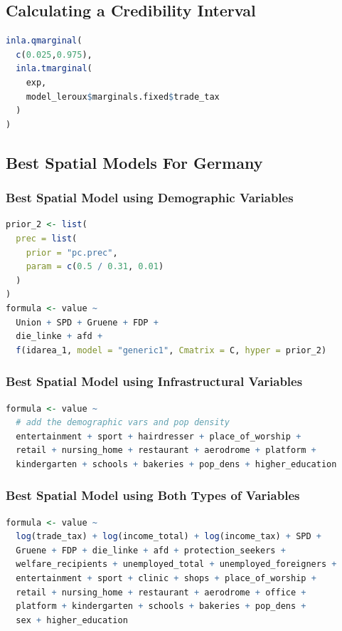 \subsection{Calculating a Credibility Interval}
\begin{lstlisting}[caption={Extracting the credibility interval for a coefficient}, label={codeCredibility}, language=R]
inla.qmarginal(
  c(0.025,0.975),
  inla.tmarginal(
    exp,
    model_leroux$marginals.fixed$trade_tax
  )
)
\end{lstlisting}
\subsection{Best Spatial Models For Germany}
\subsubsection{Best Spatial Model using Demographic Variables}
\begin{lstlisting}[caption={The code for the demographic model.}, label={codeDemoGermany}, language=R]
prior_2 <- list(
  prec = list(
    prior = "pc.prec",
    param = c(0.5 / 0.31, 0.01)
  )
)
formula <- value ~
  Union + SPD + Gruene + FDP +
  die_linke + afd + 
  f(idarea_1, model = "generic1", Cmatrix = C, hyper = prior_2)
\end{lstlisting}
\subsubsection{Best Spatial Model using Infrastructural Variables}
\begin{lstlisting}[caption={The code for the infrastructure model.}, label={codeInfraGermany}, language=R]
formula <- value ~
  # add the demographic vars and pop density
  entertainment + sport + hairdresser + place_of_worship +
  retail + nursing_home + restaurant + aerodrome + platform +
  kindergarten + schools + bakeries + pop_dens + higher_education 
\end{lstlisting}
\subsubsection{Best Spatial Model using Both Types of Variables}
\begin{lstlisting}[caption={The code for the demographic + infrastructure model.}, label={codeBothGermany}, language=R]
formula <- value ~
  log(trade_tax) + log(income_total) + log(income_tax) + SPD +
  Gruene + FDP + die_linke + afd + protection_seekers +
  welfare_recipients + unemployed_total + unemployed_foreigners +
  entertainment + sport + clinic + shops + place_of_worship +
  retail + nursing_home + restaurant + aerodrome + office +
  platform + kindergarten + schools + bakeries + pop_dens +
  sex + higher_education 
\end{lstlisting}
